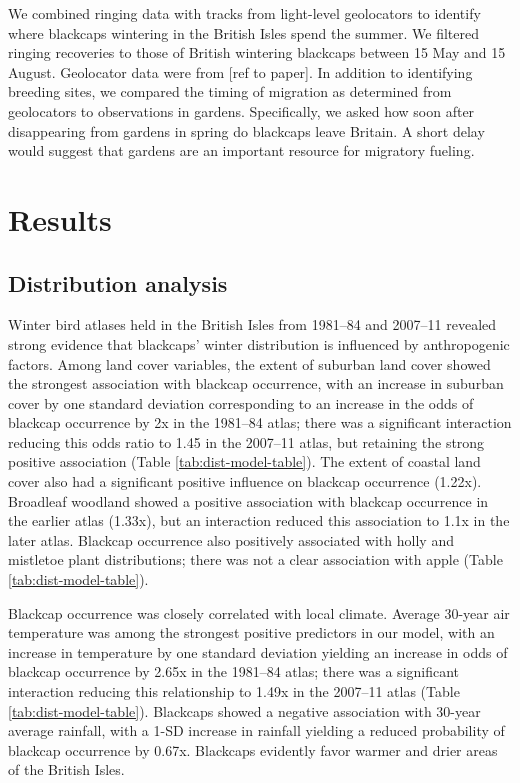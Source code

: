 \documentclass[a4paper, twoside]{templates/ociamthesis}
\begin{document}
We combined ringing data with tracks from light-level geolocators to identify where blackcaps wintering in the British Isles spend the summer. We filtered ringing recoveries to those of British wintering blackcaps between 15 May and 15 August. Geolocator data were from {[}ref to paper{]}. In addition to identifying breeding sites, we compared the timing of migration as determined from geolocators to observations in gardens. Specifically, we asked how soon after disappearing from gardens in spring do blackcaps leave Britain. A short delay would suggest that gardens are an important resource for migratory fueling.

\hypertarget{results}{%
\section{Results}\label{results}}

\hypertarget{distribution-analysis}{%
\subsection{Distribution analysis}\label{distribution-analysis}}

Winter bird atlases held in the British Isles from 1981--84 and 2007--11 revealed strong evidence that blackcaps' winter distribution is influenced by anthropogenic factors. Among land cover variables, the extent of suburban land cover showed the strongest association with blackcap occurrence, with an increase in suburban cover by one standard deviation corresponding to an increase in the odds of blackcap occurrence by 2x in the 1981--84 atlas; there was a significant interaction reducing this odds ratio to 1.45 in the 2007--11 atlas, but retaining the strong positive association (Table \ref{tab:dist-model-table}). The extent of coastal land cover also had a significant positive influence on blackcap occurrence (1.22x). Broadleaf woodland showed a positive association with blackcap occurrence in the earlier atlas (1.33x), but an interaction reduced this association to 1.1x in the later atlas. Blackcap occurrence also positively associated with holly and mistletoe plant distributions; there was not a clear association with apple (Table \ref{tab:dist-model-table}).

Blackcap occurrence was closely correlated with local climate. Average 30-year air temperature was among the strongest positive predictors in our model, with an increase in temperature by one standard deviation yielding an increase in odds of blackcap occurrence by 2.65x in the 1981--84 atlas; there was a significant interaction reducing this relationship to 1.49x in the 2007--11 atlas (Table \ref{tab:dist-model-table}). Blackcaps showed a negative association with 30-year average rainfall, with a 1-SD increase in rainfall yielding a reduced probability of blackcap occurrence by 0.67x. Blackcaps evidently favor warmer and drier areas of the British Isles.
\end{document}
